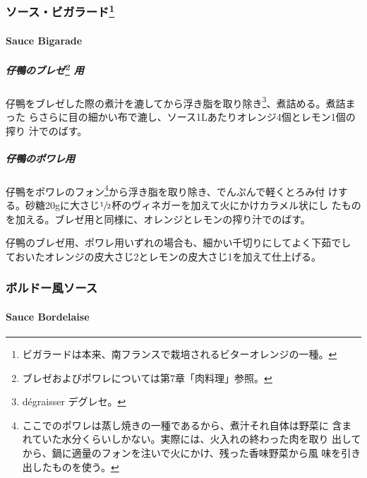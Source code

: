 \documentclass[twoside,12Q,b5j]{escoffierltjsbook}
\newenvironment{recette}{\begin{small}\begin{spacing}{1}\begin{multicols}{2}}{\end{multicols}\end{spacing}\end{small}}
\begin{document}
\begin{recette}
\subsubsection[ソース・ビガラード]{\texorpdfstring{ソース・ビガラード\footnote{ビガラードは本来、南フランスで栽培されるビターオレンジの一種。}}{ソース・ビガラード}}\label{ux30bdux30fcux30b9ux30d3ux30acux30e9ux30fcux30c91}

\paragraph{Sauce Bigarade}\label{sauce-bigarade}


\subparagraph[仔鴨のブレゼ 用]{\texorpdfstring{仔鴨のブレゼ\footnote{ブレゼおよびポワレについては第7章「肉料理」参照。}
用}{仔鴨のブレゼ 用}}\label{sauce-bigarade-pour-canetons-braises}

仔鴨をブレゼした際の煮汁を漉してから浮き脂を取り除き\footnote{dégraisser
  デグレセ。}、煮詰める。煮詰まった
らさらに目の細かい布で漉し、ソース1Lあたりオレンジ4個とレモン1個の搾り
汁でのばす。

\subparagraph{仔鴨のポワレ用}\label{sauce-bigarade-pour-canetons-poeles}

仔鴨をポワレのフォン\footnote{ここでのポワレは蒸し焼きの一種であるから、煮汁それ自体は野菜に
  含まれていた水分くらいしかない。実際には、火入れの終わった肉を取り
  出してから、鍋に適量のフォンを注いで火にかけ、残った香味野菜から風
  味を引き出したものを使う。}から浮き脂を取り除き、でんぷんで軽くとろみ付
けする。砂糖20gに大さじ\(\sfrac{1}{2}\)杯のヴィネガーを加えて火にかけカラメル状にし
たものを加える。ブレゼ用と同様に、オレンジとレモンの搾り汁でのばす。

仔鴨のブレゼ用、ポワレ用いずれの場合も、細かい千切りにしてよく下茹でし
ておいたオレンジの皮大さじ2とレモンの皮大さじ1を加えて仕上げる。

\vspace*{1.7\zw}

\subsubsection{ボルドー風ソース}\label{ux30dcux30ebux30c9ux30fcux98a8ux30bdux30fcux30b9}

\paragraph{Sauce Bordelaise}\label{sauce-bordelaise}


\end{recette}
\end{document}
